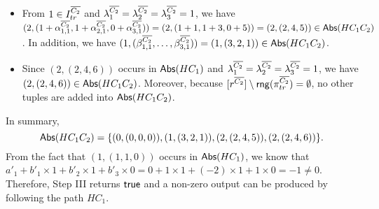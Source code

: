\begin{example}
\begin{itemize}
\item From $1 \in I^{\overline{C_2}}_{tr}$ and $\lambda^{\overline{C_2}}_1 = \lambda^{\overline{C_2}}_2 = \lambda^{\overline{C_2}}_3 = 1$, we have $(2, (1 + \alpha^{\overline{C_2}}_{1, 1}, 1+\alpha^{\overline{C_2}}_{2, 1}, 0 + \alpha^{\overline{C_2}}_{3, 1})) = (2, (1+1, 1+3, 0 +5))= (2, (2, 4, 5)) \in \mathsf{Abs}(HC_1C_2)$. In addition, we have $(1, (\beta^{\overline{C_2}}_{1, 1}, \dots, \beta^{\overline{C_2}}_{3, 1}))=(1, (3, 2, 1)) \in \mathsf{Abs}(HC_1C_2)$.

\item Since $(2, (2, 4, 6))$ occurs in $\mathsf{Abs}(HC_1)$ and $\lambda^{\overline{C_2}}_1 = \lambda^{\overline{C_2}}_2 = \lambda^{\overline{C_2}}_3 = 1$, we have $(2, (2, 4, 6)) \in \mathsf{Abs}(HC_1C_2)$. Moreover, because $[r^{\overline{C_2}}] \setminus \mathsf{rng}(\pi^{\overline{C_2}}_{tr})=\emptyset$, no other tuples are added into $\mathsf{Abs}(HC_1C_2)$.
\end{itemize}
In summary, 
$$\mathsf{Abs}(HC_1C_2)= \{(0,(0,0,0)), (1, (3,2,1)), (2, (2,4,5)), (2, (2, 4,6))\}.$$
From the fact that $(1, (1, 1, 0))$ occurs in $\mathsf{Abs}(HC_1)$, we know that $a'_1 + b'_1 \times 1 + b'_2 \times 1 + b'_3 \times 0 = 0 + 1 \times 1 + (-2) \times 1 + 1 \times 0 = -1 \neq 0$. Therefore, Step III returns $\mathsf{true}$ and a non-zero output can be produced by following the path $HC_1$.
\end{example}

